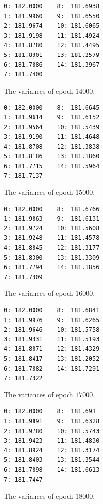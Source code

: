 \documentclass[a4paper, 10pt, notitlepage, twocolumn]{article}
\begin{document}
\begin{figure}[!ht]
 \begin{verbatim}
0: 182.0000    8:  181.6938
1: 181.9960    9:  181.6550
2: 181.9674    10: 181.6065
3: 181.9198    11: 181.4924
4: 181.8780    12: 181.4495
5: 181.8301    13: 181.2579
6: 181.7886    14: 181.3967
7: 181.7400
 \end{verbatim}
 \vspace{-20pt} 
 \caption{The variances of epoch $14000$.}
\end{figure}

\begin{figure}[!ht]
 \begin{verbatim}
0: 182.0000    8:  181.6645
1: 181.9614    9:  181.6152
2: 181.9564    10: 181.5439
3: 181.9190    11: 181.4648
4: 181.8708    12: 181.3838
5: 181.8186    13: 181.1860
6: 181.7715    14: 181.5964
7: 181.7137
 \end{verbatim}
 \vspace{-20pt} 
 \caption{The variances of epoch $15000$.}
\end{figure}

\begin{figure}[!ht]
 \begin{verbatim}
0: 182.0000    8:  181.6766
1: 181.9863    9:  181.6131
2: 181.9724    10: 181.5608
3: 181.9248    11: 181.4578
4: 181.8845    12: 181.3177
5: 181.8300    13: 181.3309
6: 181.7794    14: 181.1856
7: 181.7309
 \end{verbatim}
 \vspace{-20pt} 
 \caption{The variances of epoch $16000$.}
\end{figure}

\begin{figure}[!ht]
 \begin{verbatim}
0: 182.0000    8:  181.6841
1: 181.9976    9:  181.6265
2: 181.9646    10: 181.5758
3: 181.9331    11: 181.5193
4: 181.8871    12: 181.4329
5: 181.8417    13: 181.2052
6: 181.7882    14: 181.7291
7: 181.7322
 \end{verbatim}
 \vspace{-20pt} 
 \caption{The variances of epoch $17000$.}
\end{figure}

\begin{figure}[!ht]
 \begin{verbatim}
0: 182.0000    8:  181.691
1: 181.9891    9:  181.6328
2: 181.9780    10: 181.5743
3: 181.9423    11: 181.4830
4: 181.8924    12: 181.3174
5: 181.8403    13: 181.3544
6: 181.7898    14: 181.6613
7: 181.7447
 \end{verbatim}
 \vspace{-20pt} 
 \caption{The variances of epoch $18000$.}
\end{figure}
\end{document}
